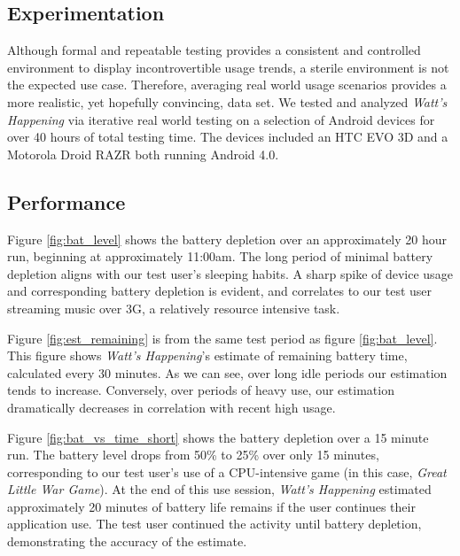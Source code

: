 \subsection{Experimentation}
Although formal and repeatable testing provides a consistent and controlled environment to display incontrovertible usage trends, a sterile environment is not the expected use case.
Therefore, averaging real world usage scenarios provides a more realistic, yet hopefully convincing, data set.
We tested and analyzed \emph{Watt's Happening} via iterative real world testing on a selection of Android devices for over 40 hours of total testing time.
The devices included an HTC EVO 3D and a Motorola Droid RAZR both running Android 4.0. 

\subsection{Performance}
Figure \ref{fig:bat_level} shows the battery depletion over an approximately 20 hour run, beginning at approximately 11:00am. 
The long period of minimal battery depletion aligns with our test user's sleeping habits.
A sharp spike of device usage and corresponding battery depletion is evident, and correlates to our test user streaming music over 3G, a relatively resource intensive task.

Figure \ref{fig:est_remaining} is from the same test period as figure \ref{fig:bat_level}.
This figure shows \emph{Watt's Happening}'s estimate of remaining battery time, calculated every 30 minutes.
As we can see, over long idle periods our estimation tends to increase.
Conversely, over periods of heavy use, our estimation dramatically decreases in correlation with recent high usage.

Figure \ref{fig:bat_vs_time_short} shows the battery depletion over a 15 minute run.
The battery level drops from 50\% to 25\% over only 15 minutes, corresponding to our test user's use of a CPU-intensive game (in this case, \emph{Great Little War Game}\cite{glwg}).
At the end of this use session, \emph{Watt's Happening} estimated  approximately 20 minutes of battery life remains if the user continues their application use.
The test user continued the activity until battery depletion, demonstrating the accuracy of the estimate.


